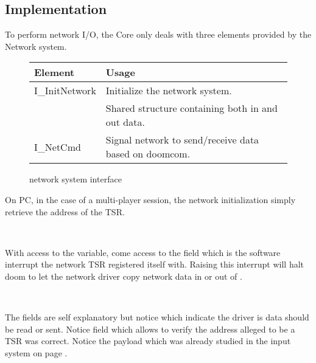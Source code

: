 \subsection{Implementation}
To perform network I/O, the Core only deals with three elements provided by the Network system.\\
\par
 \begin{figure}[H]
\centering  
\begin{tabularx}{\textwidth}{ L{0.6}  L{1.4}}
  \toprule
  \textbf{Element} &  \textbf{Usage}\\

  \toprule 
   I\_InitNetwork & Initialize the network system.\\
    & Shared structure containing both in and out data.\\
   I\_NetCmd & Signal network to send/receive data based on doomcom.\\
   \toprule
\end{tabularx}
\caption{\doom network system interface}
\end{figure}



On PC, in the case of a multi-player session, the network initialization simply retrieve the address of the TSR.\\
\par
{}\\
\par
With access to the  variable, come access to the field  which is the software interrupt the network TSR registered itself with. Raising this interrupt will halt doom to let the network driver copy network data in or out of .



 \label{doomcom_t.c} \\
\par
The fields are self explanatory but notice  which indicate the driver is data should be read or sent. Notice field  which allows \doom to verify the address alleged to be a TSR was correct. Notice the  payload which was already studied in the input system on page \pageref{cmd_t_type}.\\
\pagebreak




